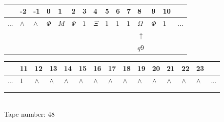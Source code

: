 \documentclass[11pt]{article}
\begin{document}
\begin{table}[H]
\centering
\begin{tabular}{lllllllllllllll}
 & -2 & -1 & 0 & 1 & 2 & 3 & 4 & 5 & 6 & 7 & 8 & 9 & 10 & \\
\hline
$...$ & \multicolumn{1}{|l|}{$\wedge$} & \multicolumn{1}{|l|}{$\wedge$} & \multicolumn{1}{|l|}{$\Phi$} & \multicolumn{1}{|l|}{$M$} & \multicolumn{1}{|l|}{$\Psi$} & \multicolumn{1}{|l|}{$1$} & \multicolumn{1}{|l|}{$\Xi$} & \multicolumn{1}{|l|}{$1$} & \multicolumn{1}{|l|}{$1$} & \multicolumn{1}{|l|}{$1$} & \multicolumn{1}{|l|}{$\Omega$} & \multicolumn{1}{|l|}{$\Phi$} & \multicolumn{1}{|l|}{$1$} & $...$\\
\hline
&  &  &  &  &  &  &  &  &  &  & $\uparrow$ &  &  &  \\
&  &  &  &  &  &  &  &  &  &  & $ q9 $ &  &  &  \\
\end{tabular}
\begin{tabular}{lllllllllllllll}
 & 11 & 12 & 13 & 14 & 15 & 16 & 17 & 18 & 19 & 20 & 21 & 22 & 23 & \\
\hline
$...$ & \multicolumn{1}{|l|}{$1$} & \multicolumn{1}{|l|}{$\wedge$} & \multicolumn{1}{|l|}{$\wedge$} & \multicolumn{1}{|l|}{$\wedge$} & \multicolumn{1}{|l|}{$\wedge$} & \multicolumn{1}{|l|}{$\wedge$} & \multicolumn{1}{|l|}{$\wedge$} & \multicolumn{1}{|l|}{$\wedge$} & \multicolumn{1}{|l|}{$\wedge$} & \multicolumn{1}{|l|}{$\wedge$} & \multicolumn{1}{|l|}{$\wedge$} & \multicolumn{1}{|l|}{$\wedge$} & \multicolumn{1}{|l|}{$\wedge$} & $...$\\
\hline
&  &  &  &  &  &  &  &  &  &  &  &  &  &  \\
&  &  &  &  &  &  &  &  &  &  &  &  &  &  \\
\end{tabular}
\\
Tape number: 48
\noindent\makebox[\linewidth]{\hdashrule{\textwidth}{1pt}{1pt}}\end{table}
\end{document}
